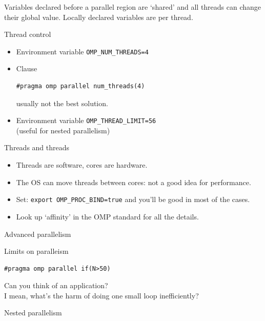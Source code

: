 \begin{instructor}
  Variables declared before a parallel region are `shared'
  and all threads can change their global value.
  Locally declared variables are per thread.
\end{instructor}

\begin{numberedframe}{Thread control}
  \begin{itemize}
  \item Environment variable \lstinline[language=shell]{OMP_NUM_THREADS=4}
  \item Clause \\
\begin{lstlisting}[numbers=none]
#pragma omp parallel num_threads(4)
\end{lstlisting}
    usually not the best solution.
  \item Environment variable \lstinline[language=shell]{OMP_THREAD_LIMIT=56}\\
    (useful for nested parallelism)
  \end{itemize}
\end{numberedframe}

\begin{numberedframe}{Threads and threads}
  \begin{itemize}    
  \item Threads are software, cores are hardware.
  \item The OS can move threads between cores: not a good idea for
    performance.
  \item Set: \lstinline[language=shell]{export OMP_PROC_BIND=true} and you'll be good in
    most of the cases.
  \item Look up `affinity' in the OMP standard for all the details.
  \end{itemize}
\end{numberedframe}

 {Advanced parallelism}

\begin{numberedframe}{Limits on paralleism}
\begin{lstlisting}[numbers=none]
#pragma omp parallel if(N>50)
\end{lstlisting}
Can you think of an application?\\
I mean, what's the harm of doing one small loop inefficiently?
\end{numberedframe}

\begin{numberedframe}{Nested parallelism}
  
\end{numberedframe}

